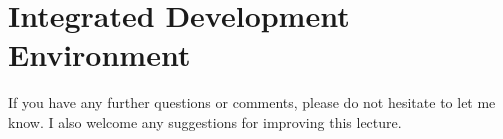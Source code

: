 \section{Integrated Development Environment}
If you have any further questions or comments, please do not hesitate to let me know. I also welcome any suggestions for improving this lecture.



